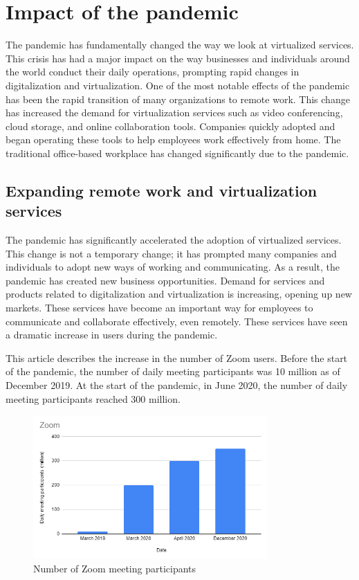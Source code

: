 \documentclass[12pt]{article}
\begin{document}
\section{Impact of the pandemic}
The pandemic has fundamentally changed the way we look at virtualized services.
This crisis has had a major impact on the way businesses and individuals around
the world conduct their daily operations, prompting rapid changes in
digitalization and virtualization. One of the most notable effects of the
pandemic has been the rapid transition of many organizations to remote work.
This change has increased the demand for virtualization services such as video
conferencing, cloud storage, and online collaboration tools. Companies quickly
adopted and began operating these tools to help employees work effectively from
home. The traditional office-based workplace has changed significantly due to
the pandemic.

\subsection{Expanding remote work and virtualization services}
The pandemic has significantly accelerated the adoption of virtualized
services. This change is not a temporary change; it has prompted many companies
and individuals to adopt new ways of working and communicating. As a result,
the pandemic has created new business opportunities. Demand for services and
products related to digitalization and virtualization is increasing, opening up
new markets. These services have become an important way for employees to
communicate and collaborate effectively, even remotely. These services have
seen a dramatic increase in users during the pandemic.

This article \cite{ref5} describes
the increase in the number of Zoom users. Before the start of the pandemic, the
number of daily meeting participants was 10 million as of December 2019. At the
start of the pandemic, in June 2020, the number of daily meeting participants
reached 300 million.

\begin{figure}[H]
    \centering
    \includegraphics[width=0.8\textwidth]{zoom.png}
    \caption{Number of Zoom meeting participants}
    \label{fig:my_label}
\end{figure}
\end{document}
